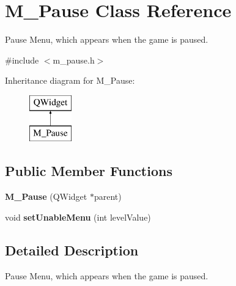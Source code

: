 \hypertarget{class_m___pause}{}\section{M\+\_\+\+Pause Class Reference}
\label{class_m___pause}


Pause Menu, which appears when the game is paused.  




{\ttfamily \#include $<$m\+\_\+pause.\+h$>$}

Inheritance diagram for M\+\_\+\+Pause\+:\begin{figure}[H]
\begin{center}
\leavevmode
\includegraphics[height=2.000000cm]{class_m___pause}
\end{center}
\end{figure}
\subsection*{Public Member Functions}
\begin{DoxyCompactItemize}
\item 
\hypertarget{class_m___pause_ac1cb95e28d9c158d4dfdba4a08491432}{}{\bfseries M\+\_\+\+Pause} (Q\+Widget $\ast$parent)\label{class_m___pause_ac1cb95e28d9c158d4dfdba4a08491432}

\item 
\hypertarget{class_m___pause_a1c4c4a10f597d250973481b81d575e14}{}void {\bfseries set\+Unable\+Menu} (int level\+Value)\label{class_m___pause_a1c4c4a10f597d250973481b81d575e14}

\end{DoxyCompactItemize}


\subsection{Detailed Description}
Pause Menu, which appears when the game is paused. 

